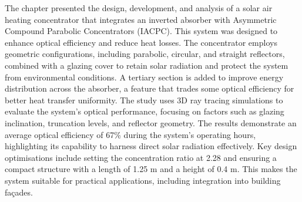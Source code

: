 The chapter presented the design, development, and analysis of a solar air heating concentrator that integrates an inverted absorber with Asymmetric Compound Parabolic Concentrators (IACPC). This system was designed to enhance optical efficiency and reduce heat losses. The concentrator employs geometric configurations, including parabolic, circular, and straight reflectors, combined with a glazing cover to retain solar radiation and protect the system from environmental conditions. A tertiary section is added to improve energy distribution across the absorber, a feature that trades some optical efficiency for better heat transfer uniformity. The study uses 3D ray tracing simulations to evaluate the system's optical performance, focusing on factors such as glazing inclination, truncation levels, and reflector geometry. The results demonstrate an average optical efficiency of 67\% during the system's operating hours, highlighting its capability to harness direct solar radiation effectively. Key design optimisations include setting the concentration ratio at 2.28 and ensuring a compact structure with a length of 1.25 m and a height of 0.4 m. This makes the system suitable for practical applications, including integration into building fa\c{c}ades.

